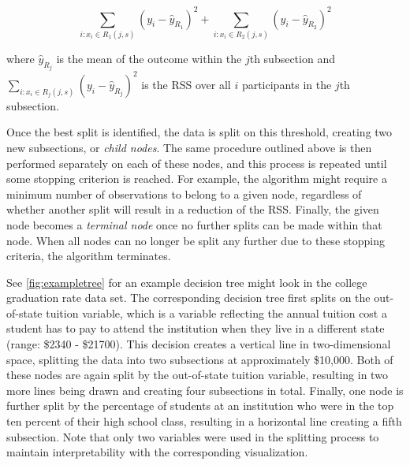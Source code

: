 \begin{equation} 
\sum_{i: x_i \in R_1(j, s)} (y_i - \hat{y}_{R_1})^2 + \sum_{i: x_i \in R_2(j, s)} (y_i - \hat{y}_{R_2})^2
\end{equation}

\noindent where $\hat{y}_{R_j}$ is the mean of the outcome within the $j$th subsection and $\sum_{i: x_i \in R_j(j, s)} (y_i - \hat{y}_{R_j})^2$ is the RSS over all $i$ participants in the $j$th subsection.

	Once the best split is identified, the data is split on this threshold, creating two new subsections, or \textit{child nodes}. The same procedure outlined above is then performed separately on each of these nodes, and this process is repeated until some stopping criterion is reached. For example, the algorithm might require a minimum number of observations to belong to a given node, regardless of whether another split will result in a reduction of the RSS. Finally, the given node becomes a \textit{terminal node} once no further splits can be made within that node. When all nodes can no longer be split any further due to these stopping criteria, the algorithm terminates. 

	See \autoref{fig:exampletree} for an example decision tree might look in the college graduation rate data set. The corresponding decision tree first splits on the out-of-state tuition variable, which is a variable reflecting the annual tuition cost a student has to pay to attend the institution when they live in a different state (range: \$2340 - \$21700). This decision creates a vertical line in two-dimensional space, splitting the data into two subsections at approximately \$10,000. Both of these nodes are again split by the out-of-state tuition variable, resulting in two more lines being drawn and creating four subsections in total. Finally, one node is further split by the percentage of students at an institution who were in the top ten percent of their high school class, resulting in a horizontal line creating a fifth subsection. Note that only two variables were used in the splitting process to maintain interpretability with the corresponding visualization.


